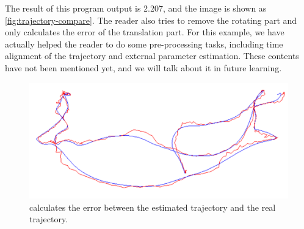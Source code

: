 The result of this program output is 2.207, and the image is shown as \autoref{fig:trajectory-compare}. The reader also tries to remove the rotating part and only calculates the error of the translation part. For this example, we have actually helped the reader to do some pre-processing tasks, including time alignment of the trajectory and external parameter estimation. These contents have not been mentioned yet, and we will talk about it in future learning.

\begin{figure}[!ht]
	\centering
	\includegraphics[width=1.0\textwidth]{chapter05/lieGroup/trajectory-compare.pdf}
	\caption{calculates the error between the estimated trajectory and the real trajectory. }
	\label{fig:trajectory-compare}
\end{figure}